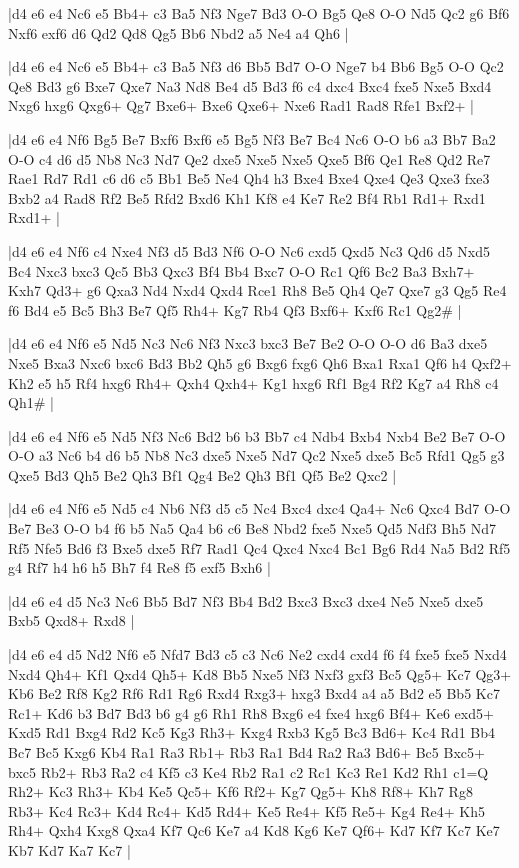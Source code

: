 \whitename{}
\blackname{}
\makegametitle
|d4 e6 e4 Nc6 e5 Bb4+ c3 Ba5 Nf3 Nge7 Bd3 O-O Bg5 Qe8 O-O Nd5 Qc2 g6 Bf6 Nxf6 exf6 d6 Qd2 Qd8 Qg5 Bb6 Nbd2 a5 Ne4 a4 Qh6  |

\whitename{}
\blackname{}
\makegametitle
|d4 e6 e4 Nc6 e5 Bb4+ c3 Ba5 Nf3 d6 Bb5 Bd7 O-O Nge7 b4 Bb6 Bg5 O-O Qc2 Qe8 Bd3 g6 Bxe7 Qxe7 Na3 Nd8 Be4 d5 Bd3 f6 c4 dxc4 Bxc4 fxe5 Nxe5 Bxd4 Nxg6 hxg6 Qxg6+ Qg7 Bxe6+ Bxe6 Qxe6+ Nxe6 Rad1 Rad8 Rfe1 Bxf2+  |

\whitename{}
\blackname{}
\makegametitle
|d4 e6 e4 Nf6 Bg5 Be7 Bxf6 Bxf6 e5 Bg5 Nf3 Be7 Bc4 Nc6 O-O b6 a3 Bb7 Ba2 O-O c4 d6 d5 Nb8 Nc3 Nd7 Qe2 dxe5 Nxe5 Nxe5 Qxe5 Bf6 Qe1 Re8 Qd2 Re7 Rae1 Rd7 Rd1 c6 d6 c5 Bb1 Be5 Ne4 Qh4 h3 Bxe4 Bxe4 Qxe4 Qe3 Qxe3 fxe3 Bxb2 a4 Rad8 Rf2 Be5 Rfd2 Bxd6 Kh1 Kf8 e4 Ke7 Re2 Bf4 Rb1 Rd1+ Rxd1 Rxd1+  |

\whitename{}
\blackname{}
\makegametitle
|d4 e6 e4 Nf6 c4 Nxe4 Nf3 d5 Bd3 Nf6 O-O Nc6 cxd5 Qxd5 Nc3 Qd6 d5 Nxd5 Bc4 Nxc3 bxc3 Qc5 Bb3 Qxc3 Bf4 Bb4 Bxc7 O-O Rc1 Qf6 Bc2 Ba3 Bxh7+ Kxh7 Qd3+ g6 Qxa3 Nd4 Nxd4 Qxd4 Rce1 Rh8 Be5 Qh4 Qe7 Qxe7 g3 Qg5 Re4 f6 Bd4 e5 Bc5 Bh3 Be7 Qf5 Rh4+ Kg7 Rb4 Qf3 Bxf6+ Kxf6 Rc1 Qg2\#  |

\whitename{}
\blackname{}
\makegametitle
|d4 e6 e4 Nf6 e5 Nd5 Nc3 Nc6 Nf3 Nxc3 bxc3 Be7 Be2 O-O O-O d6 Ba3 dxe5 Nxe5 Bxa3 Nxc6 bxc6 Bd3 Bb2 Qh5 g6 Bxg6 fxg6 Qh6 Bxa1 Rxa1 Qf6 h4 Qxf2+ Kh2 e5 h5 Rf4 hxg6 Rh4+ Qxh4 Qxh4+ Kg1 hxg6 Rf1 Bg4 Rf2 Kg7 a4 Rh8 c4 Qh1\#  |

\whitename{}
\blackname{}
\makegametitle
|d4 e6 e4 Nf6 e5 Nd5 Nf3 Nc6 Bd2 b6 b3 Bb7 c4 Ndb4 Bxb4 Nxb4 Be2 Be7 O-O O-O a3 Nc6 b4 d6 b5 Nb8 Nc3 dxe5 Nxe5 Nd7 Qc2 Nxe5 dxe5 Bc5 Rfd1 Qg5 g3 Qxe5 Bd3 Qh5 Be2 Qh3 Bf1 Qg4 Be2 Qh3 Bf1 Qf5 Be2 Qxc2  |

\whitename{}
\blackname{}
\makegametitle
|d4 e6 e4 Nf6 e5 Nd5 c4 Nb6 Nf3 d5 c5 Nc4 Bxc4 dxc4 Qa4+ Nc6 Qxc4 Bd7 O-O Be7 Be3 O-O b4 f6 b5 Na5 Qa4 b6 c6 Be8 Nbd2 fxe5 Nxe5 Qd5 Ndf3 Bh5 Nd7 Rf5 Nfe5 Bd6 f3 Bxe5 dxe5 Rf7 Rad1 Qc4 Qxc4 Nxc4 Bc1 Bg6 Rd4 Na5 Bd2 Rf5 g4 Rf7 h4 h6 h5 Bh7 f4 Re8 f5 exf5 Bxh6  |

\whitename{}
\blackname{}
\makegametitle
|d4 e6 e4 d5 Nc3 Nc6 Bb5 Bd7 Nf3 Bb4 Bd2 Bxc3 Bxc3 dxe4 Ne5 Nxe5 dxe5 Bxb5 Qxd8+ Rxd8  |

\whitename{}
\blackname{}
\makegametitle
|d4 e6 e4 d5 Nd2 Nf6 e5 Nfd7 Bd3 c5 c3 Nc6 Ne2 cxd4 cxd4 f6 f4 fxe5 fxe5 Nxd4 Nxd4 Qh4+ Kf1 Qxd4 Qh5+ Kd8 Bb5 Nxe5 Nf3 Nxf3 gxf3 Bc5 Qg5+ Kc7 Qg3+ Kb6 Be2 Rf8 Kg2 Rf6 Rd1 Rg6 Rxd4 Rxg3+ hxg3 Bxd4 a4 a5 Bd2 e5 Bb5 Kc7 Rc1+ Kd6 b3 Bd7 Bd3 b6 g4 g6 Rh1 Rh8 Bxg6 e4 fxe4 hxg6 Bf4+ Ke6 exd5+ Kxd5 Rd1 Bxg4 Rd2 Kc5 Kg3 Rh3+ Kxg4 Rxb3 Kg5 Bc3 Bd6+ Kc4 Rd1 Bb4 Bc7 Bc5 Kxg6 Kb4 Ra1 Ra3 Rb1+ Rb3 Ra1 Bd4 Ra2 Ra3 Bd6+ Bc5 Bxc5+ bxc5 Rb2+ Rb3 Ra2 c4 Kf5 c3 Ke4 Rb2 Ra1 c2 Rc1 Kc3 Re1 Kd2 Rh1 c1=Q Rh2+ Kc3 Rh3+ Kb4 Ke5 Qc5+ Kf6 Rf2+ Kg7 Qg5+ Kh8 Rf8+ Kh7 Rg8 Rb3+ Kc4 Rc3+ Kd4 Rc4+ Kd5 Rd4+ Ke5 Re4+ Kf5 Re5+ Kg4 Re4+ Kh5 Rh4+ Qxh4 Kxg8 Qxa4 Kf7 Qc6 Ke7 a4 Kd8 Kg6 Ke7 Qf6+ Kd7 Kf7 Kc7 Ke7 Kb7 Kd7 Ka7 Kc7  |

